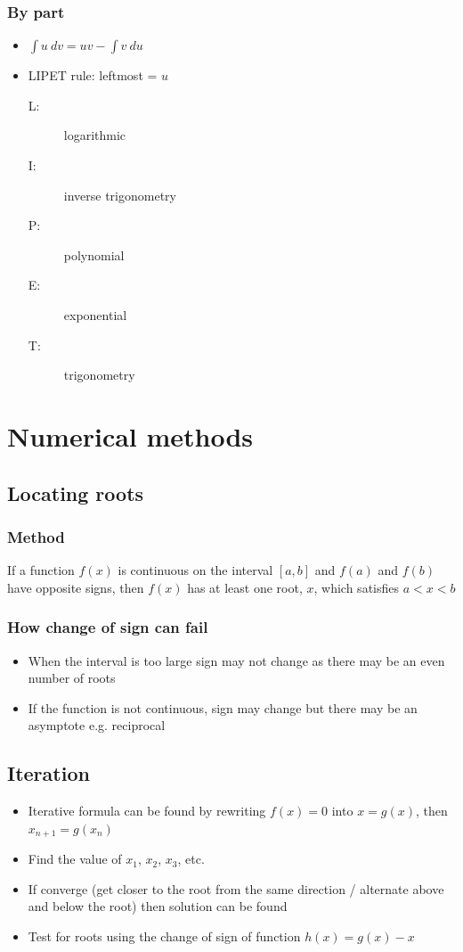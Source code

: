 \documentclass[A4paper]{article}
\begin{document}
	\subsubsection{By part}
	\begin{itemize}
		\item $\int u \: dv = uv - \int v \: du$
		\item LIPET rule: leftmost = $u$
		\begin{description}
			\item[L:] logarithmic
			\item[I:] inverse trigonometry
			\item[P:] polynomial
			\item[E:] exponential
			\item[T:] trigonometry
		\end{description}
	\end{itemize}
	
	
	\pagebreak

	\section{Numerical methods}
	\subsection{Locating roots}
	\subsubsection{Method}
	If a function $f(x)$ is continuous on the interval $[a,b]$ and $f(a)$ and $f(b)$ have opposite signs, then $f(x)$ has at least one root, $x$, which satisfies $a<x<b$
	\subsubsection{How change of sign can fail}
	\begin{itemize}
		\item When the interval is too large sign may not change as there may be an even number of roots
		\item If the function is not continuous, sign may change but there may be an asymptote e.g. reciprocal
	\end{itemize}
	
	\subsection{Iteration}
	\begin{itemize}
		\item Iterative formula can be found by rewriting $f(x)=0$ into $x=g(x)$, then $x_{n+1}=g(x_n)$
		\item Find the value of $x_1$, $x_2$, $x_3$, etc.
		\item If converge (get closer to the root from the same direction / alternate above and below the root) then solution can be found
		\item Test for roots using the change of sign of function $h(x)=g(x)-x$
	\end{itemize}
	
\end{document}
